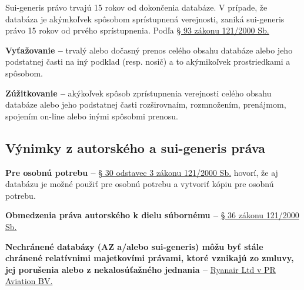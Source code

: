 Sui-generis právo trvajú 15 rokov od dokončenia databáze. V prípade, že databáza je akýmkoľvek spôsobom sprístupnená verejnosti, zaniká sui-generis právo 15 rokov od prvého sprístupnenia. Podľa \href{https://www.zakonyprolidi.cz/cs/2000-121#:~:text=pr%C3%A1vo%20po%C5%99izovatele%20datab%C3%A1ze-,trva%2015%20let%20,-od%20po%C5%99%C3%ADzen%C3%AD%20datab%C3%A1ze}{§ 93 zákonu 121/2000 Sb.}

\textbf{Vyťažovanie \--- } trvalý alebo dočasný prenos celého obsahu databáze alebo jeho podstatnej časti na iný podklad (resp. nosič) a to akýmikoľvek prostriedkami a spôsobom.

\textbf{Zúžitkovanie \--- } akýkoľvek spôsob zprístupnenia verejnosti celého obsahu databáze alebo jeho podstatnej časti rozširovnaím, rozmnožením, prenájmom, spojením on-line alebo inými spôsobmi prenosu.

\subsection{Výnimky z autorského a sui-generis práva}

\textbf{Pre osobnú potrebu \---} \href{https://www.zakonyprolidi.cz/cs/2000-121#:~:text=uziti%20pocitacoveho%20programu%20ci%20elektronicke%20databaze%20i%20pro%20osobni%20potrebu}{§ 30 odstavec 3 zákonu 121/2000 Sb.} hovorí, že aj databázu je možné použiť pre osobnú potrebu a vytvoriť kópiu pre osobnú potrebu.

\textbf{Obmedzenia práva autorského k dielu súbornému \---} \href{https://www.zakonyprolidi.cz/cs/2000-121#:~:text=k%20d%C3%ADlu%20souborn%C3%A9mu%2C-,ktere%20je%20databazi,-%2C%20nezasahuje%20opr%C3%A1vn%C4%9Bn%C3%BD%20u%C5%BEivatel}{§ 36 zákonu 121/2000 Sb.}

\textbf{Nechránené databázy (AZ a/alebo sui-generis) môžu byť stále chránené relatívnimi majetkovími právami, ktoré vznikajú zo zmluvy, jej porušenia alebo z nekalosúťažného jednania \---} \href{https://eur-lex.europa.eu/legal-content/EN/TXT/?uri=CELEX%3A62014CJ0030}{Ryanair Ltd v PR Aviation BV.}

